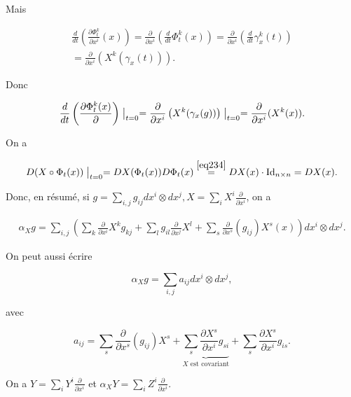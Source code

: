 \documentclass[french]{article}
\theoremstyle{definition}
\begin{document}



Mais

\begin{gather*}
  \frac{d}{dt}\left(\frac{\partial \Phi_t^{k} }{\partial x ^{i}}(x) \right) = \frac{\partial  }{\partial x ^{i}}\left(\frac{d}{dt}\Phi ^{k}_t(x)\right) = \frac{\partial  }{\partial x ^{i}} \left(\frac{d}{dt} \gamma_x ^{k}(t)\right) \\
  = \frac{\partial  }{\partial x ^{i}} \left(X ^{k}(\gamma_x(t))\right).
\end{gather*}

Donc

\begin{equation}\label{eq234}
  \frac{d}{dt}\left(\frac{\partial \Phi ^{k}_t(x) }{\partial } \right)\bigm|_{t=0} = \frac{\partial  }{\partial x ^{i}}\left(X ^{k}(\gamma_x(g))\right)\bigm|_{t=0} = \frac{\partial  }{\partial x ^{i}}(X ^{k}(x)).
\end{equation}

On a

\[D(X \circ \Phi_t(x))\bigm|_{t=0} = DX(\Phi_t(x))D \Phi_t(x) \stackrel{\ref{eq234}}{=} DX(x) \cdot \operatorname{Id}_{n \times n} = D X(x).\]

Donc, en résumé, si \(g = \displaystyle \sum_{i,j} g _{ij} d x^{i}\otimes d x^{j}, X = \displaystyle \sum_{i} X ^{i} \frac{\partial  }{\partial x ^{i}}\), on a

\begin{gather}
  \alpha_{X}g = \sum_{i,j}\left(\sum_{k} \frac{\partial  }{\partial x ^{i}} X ^{k} g _{kj} + \sum_{l} g _{il} \frac{\partial  }{\partial x ^{j}}X ^{l} + \sum_{s}  \frac{\partial  }{\partial x ^{s}}(g _{ij})X ^{s}(x)  \right)d x^{i}\otimes d x^{j}.
\end{gather}

On peut aussi écrire

\[\alpha_X g = \sum_{i,j} a _{ij}d x^{i}\otimes d x^{j},\]

avec

\[a _{ij} = \sum_{s} \frac{\partial  }{\partial x ^{s}}(g _{ij})X ^{s} + \underbrace{ \sum_{s} \frac{\partial  X ^{s}}{\partial x ^{i}} g _{si}}_{X \text{ est covariant} }+ \sum_{s} \frac{\partial  X^{s} }{\partial x ^{i}} g _{is}.\]

On a \(Y = \displaystyle \sum_{i} Y ^{i} \frac{\partial  }{\partial x ^{i}}\) et \(\alpha_X Y = \displaystyle \sum_{i} Z ^{i} \frac{\partial  }{\partial x ^{i}}  \).
\end{document}
